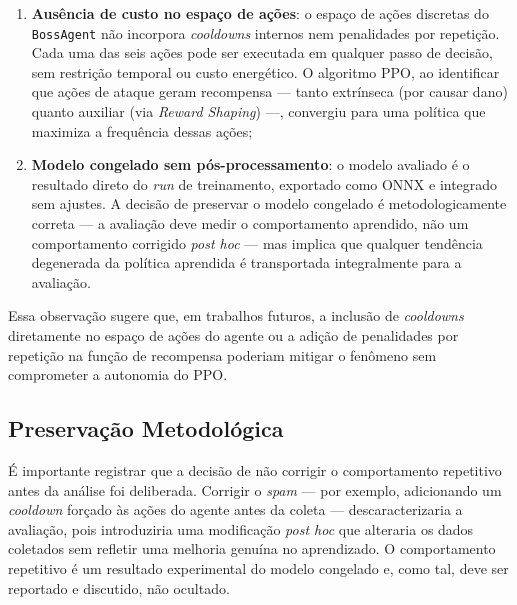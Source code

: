 \begin{enumerate}
    \item \textbf{Ausência de custo no espaço de ações}: o espaço de ações
          discretas do \texttt{BossAgent} não incorpora \textit{cooldowns}
          internos nem penalidades por repetição. Cada uma das seis ações pode
          ser executada em qualquer passo de decisão, sem restrição temporal
          ou custo energético. O algoritmo PPO, ao identificar que ações de
          ataque geram recompensa --- tanto extrínseca (por causar dano)
          quanto auxiliar (via \textit{Reward Shaping}) ---, convergiu para
          uma política que maximiza a frequência dessas ações;

    \item \textbf{Modelo congelado sem pós-processamento}: o modelo avaliado
          é o resultado direto do \textit{run} de treinamento, exportado como
          ONNX e integrado sem ajustes. A decisão de preservar o modelo
          congelado é metodologicamente correta --- a avaliação deve medir o
          comportamento aprendido, não um comportamento corrigido
          \textit{post hoc} --- mas implica que qualquer tendência degenerada
          da política aprendida é transportada integralmente para a avaliação.
\end{enumerate}

Essa observação sugere que, em trabalhos futuros, a inclusão de
\textit{cooldowns} diretamente no espaço de ações do agente ou a adição de
penalidades por repetição na função de recompensa poderiam mitigar o fenômeno
sem comprometer a autonomia do PPO.

\subsection{Preservação Metodológica}
\label{subsec:preservacao-metodologica}

É importante registrar que a decisão de não corrigir o comportamento
repetitivo antes da análise foi deliberada. Corrigir o \textit{spam} ---
por exemplo, adicionando um \textit{cooldown} forçado às ações do agente
antes da coleta --- descaracterizaria a avaliação, pois introduziria uma
modificação \textit{post hoc} que alteraria os dados coletados sem refletir
uma melhoria genuína no aprendizado. O comportamento repetitivo é um
resultado experimental do modelo congelado e, como tal, deve ser reportado
e discutido, não ocultado.

